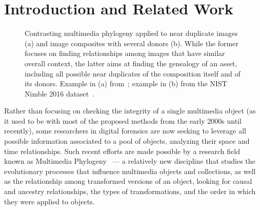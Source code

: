 \section{Introduction and Related Work}
\label{sec:intro}
%
\begin{figure}[htb]
	\begin{center}
	\caption{Contrasting multimedia phylogeny applied to near duplicate images (a) and image composites with several donors (b). While the former focuses on finding relationships among images that have similar overall context, the latter aims at finding the genealogy of an asset, including all possible near duplicates of the composition itself and of its donors. Example in (a) from~\cite{Dias_2013}; example in (b) from the NIST Nimble 2016 dataset~\cite{Nimble_2016}.}
	\label{fig:fig1}
	\end{center}
\end{figure}


Rather than focusing on checking the integrity of a single multimedia object (as it used to be with most of the proposed methods from the early 2000s until recently), some researchers in digital forensics are now seeking to leverage all possible information associated to a pool of objects, analyzing their space and time relationships. Such recent efforts are made possible by a research field known as Multimedia Phylogeny~\cite{Dias_2012,Dias_2013} --- a relatively new discipline that studies the evolutionary processes that influence multimedia objects and collections, as well as the relationship among transformed versions of an object, looking for causal and ancestry relationships, the types of transformations, and the order in which they were applied to objects. 

